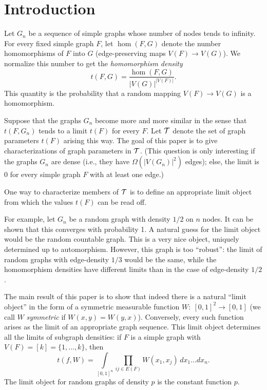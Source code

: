 \documentclass[fleqn]{article}
\begin{document}
\section{Introduction}

Let $G_n$ be a sequence of simple graphs whose number of nodes tends
to infinity. For every fixed simple graph $F$, let $\hom(F,G)$ denote
the number homomorphisms of $F$ into $G$ (edge-preserving maps
$V(F)\to V(G)$). We normalize this number to get the {\it
homomorphism density}
\[
t(F,G)=\frac{\hom(F,G)}{|V(G)|^{|V(F)|}}.
\]
This quantity is the probability that a random mapping $V(F)\to V(G)$
is a homomorphism.

Suppose that the graphs $G_n$ become more and more similar in the
sense that $t(F,G_n)$ tends to a limit $t(F)$ for every $F$. Let
${\cal T}$ denote the set of graph parameters $t(F)$ arising this way. The
goal of this paper is to give characterizations of graph parameters
in ${\cal T}$. (This question is only interesting if the graphs $G_n$ are
dense (i.e., they have $\Omega(|V(G_n)|^2)$ edges); else, the limit
is 0 for every simple graph $F$ with at least one edge.)

One way to characterize members of ${\cal T}$ is to define an appropriate
limit object from which the values $t(F)$ can be read off.

For example, let $G_n$ be a random graph with density $1/2$ on $n$
nodes. It can be shown that this converges with probability 1. A
natural guess for the limit object would be the random countable
graph. This is a very nice object, uniquely determined up to
automorphism. However, this graph is too ``robust'': the limit of
random graphs with edge-density $1/3$ would be the same, while the
homomorphism densities have different limits than in the case of
edge-density $1/2$.

The main result of this paper is to show that indeed there is a
natural ``limit object'' in the form of a symmetric measurable
function $W:~[0,1]^2\to[0,1]$ (we call $W$ {\it symmetric} if
$W(x,y)=W(y,x)$). Conversely, every such function arises as the limit
of an appropriate graph sequence. This limit object determines all
the limits of subgraph densities: if $F$ is a simple graph with
$V(F)=[k]=\{1,\dots,k\}$, then
\begin{equation}\label{INTREP}
t(f,W)=\int\limits_{[0,1]^n} \prod_{ij\in E(F)} W(x_1,x_j)\,dx_1\dots
dx_n.
\end{equation}
The limit object for random graphs of density $p$ is the constant
function $p$.
\end{document}
